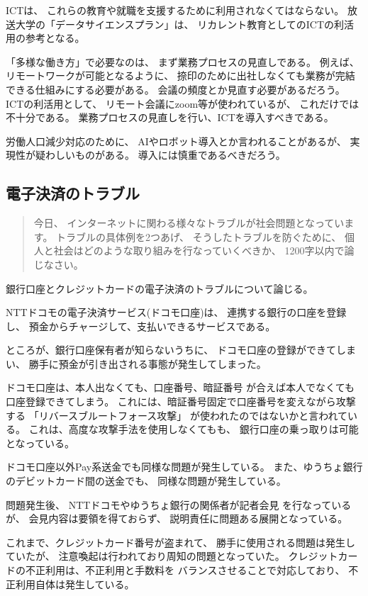 \documentclass[12pt]{jsarticle}
\begin{document}
ICTは、
これらの教育や就職を支援するために利用されなくてはならない。
放送大学の「データサイエンスプラン」は、
リカレント教育としてのICTの利活用の参考となる。

「多様な働き方」で必要なのは、
まず業務プロセスの見直しである。
例えば、リモートワークが可能となるように、
捺印のために出社しなくても業務が完結できる仕組みにする必要がある。
会議の頻度とか見直す必要があるだろう。
ICTの利活用として、
リモート会議にzoom等が使われているが、
これだけでは不十分である。
業務プロセスの見直しを行い、ICTを導入すべきである。

労働人口減少対応のために、
AIやロボット導入とか言われることがあるが、
実現性が疑わしいものがある。
導入には慎重であるべきだろう。


\subsection{電子決済のトラブル}

\begin{quotation}
今日、
インターネットに関わる様々なトラブルが社会問題となっています。
トラブルの具体例を2つあげ、
そうしたトラブルを防ぐために、
個人と社会はどのような取り組みを行なっていくべきか、
1200字以内で論じなさい。
\end{quotation}

銀行口座とクレジットカードの電子決済のトラブルについて論じる。

NTTドコモの電子決済サービス(ドコモ口座)は、
連携する銀行の口座を登録し、
預金からチャージして、支払いできるサービスである。

ところが、銀行口座保有者が知らないうちに、
ドコモ口座の登録ができてしまい、
勝手に預金が引き出される事態が発生してしまった。

ドコモ口座は、本人出なくても、口座番号、暗証番号
が合えば本人でなくても口座登録できてしまう。
これには、暗証番号固定で口座番号を変えながら攻撃する
「リバースブルートフォース攻撃」
が使われたのではないかと言われている。
これは、高度な攻撃手法を使用しなくてもも、
銀行口座の乗っ取りは可能となっている。

ドコモ口座以外Pay系送金でも同様な問題が発生している。
また、ゆうちょ銀行のデビットカード間の送金でも、
同様な問題が発生している。

問題発生後、
NTTドコモやゆうちょ銀行の関係者が記者会見
を行なっているが、
会見内容は要領を得ておらず、
説明責任に問題ある展開となっている。

これまで、クレジットカード番号が盗まれて、
勝手に使用される問題は発生していたが、
注意喚起は行われており周知の問題となっていた。
クレジットカードの不正利用は、不正利用と手数料を
バランスさせることで対応しており、
不正利用自体は発生している。
\end{document}
